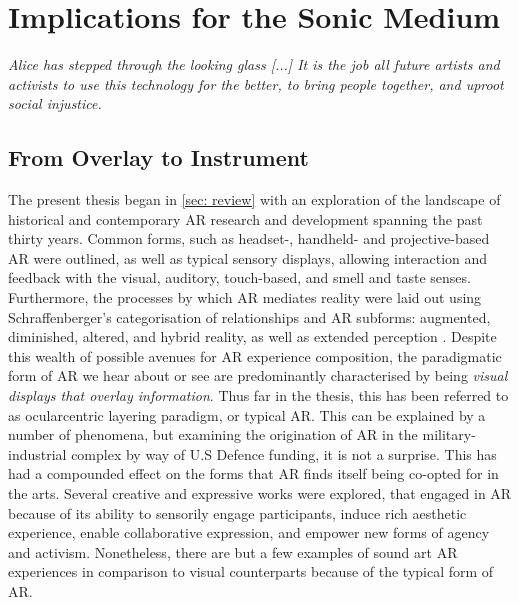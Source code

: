 \chapter{Implications for the Sonic Medium}
\label{sec: discussion}
\epigraph{\emph{Alice has stepped through the looking glass [...] It is the job all future artists and activists to use this technology for the better, to bring people together, and uproot social injustice.}}{\citep[]{skwarek2018}}
\section{From Overlay to Instrument} \label{sec: discussion-review}
The present thesis began in \autoref{sec: review} with an exploration of the landscape of historical and contemporary AR research and development spanning the past thirty years. Common forms, such as headset-, handheld- and projective-based AR were outlined, as well as typical sensory displays, allowing interaction and feedback with the visual, auditory, touch-based, and smell and taste senses. Furthermore, the processes by which AR mediates reality were laid out using Schraffenberger's categorisation of relationships and AR subforms: augmented, diminished, altered, and hybrid reality, as well as extended perception \citep{schraffenberger2018}. Despite this wealth of possible avenues for AR experience composition, the paradigmatic form of AR we hear about or see are predominantly characterised by being \textit{visual displays that overlay information}. Thus far in the thesis, this has been referred to as ocularcentric layering paradigm, or typical AR. This can be explained by a number of phenomena, but examining the origination of AR in the military-industrial complex by way of U.S Defence funding, it is not a surprise. This has had a compounded effect on the forms that AR finds itself being co-opted for in the arts. Several creative and expressive works were explored, that engaged in AR because of its ability to sensorily engage participants, induce rich aesthetic experience, enable collaborative expression, and empower new forms of agency and activism. Nonetheless, there are but a few examples of sound art AR experiences in comparison to visual counterparts because of the typical form of AR.

